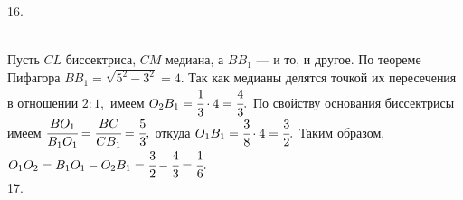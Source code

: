 \documentclass[12pt]{article}
\begin{document}
16. \begin{figure}[ht!]
\end{figure}\\
Пусть $CL$ биссектриса, $CM$ медиана, а $BB_1$ --- и то, и другое. По теореме Пифагора $BB_1=\sqrt{5^2-3^2}=4.$ Так как медианы делятся точкой их пересечения в отношении $2:1,$ имеем $O_2B_1=\cfrac{1}{3}\cdot4=\cfrac{4}{3}.$ По свойству основания биссектрисы имеем $\cfrac{BO_1}{B_1O_1}=\cfrac{BC}{CB_1}=\cfrac{5}{3},$ откуда $O_1B_1=\cfrac{3}{8}\cdot4=\cfrac{3}{2}.$ Таким образом, $O_1O_2=B_1O_1-O_2B_1=\cfrac{3}{2}-\cfrac{4}{3}=\cfrac{1}{6}.$\\
17. \begin{figure}[ht!]
\end{figure}\\
\end{document}
